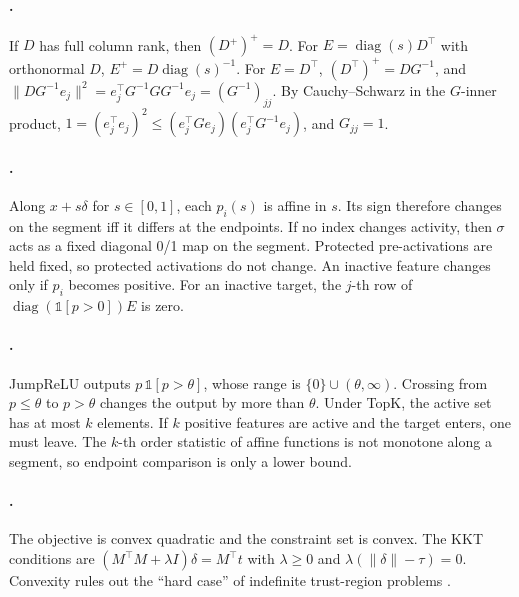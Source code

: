 \documentclass{article}
\theoremstyle{plain}
\theoremstyle{definition}
\theoremstyle{remark}
\begin{document}
\paragraph{.}
If $D$ has full column rank, then $(D^{+})^{+} = D$. For
$E = \operatorname{diag}(s)D^{\top}$ with orthonormal $D$,
$E^{+} = D\operatorname{diag}(s)^{-1}$. For $E = D^{\top}$,
$(D^{\top})^{+} = DG^{-1}$, and
$\|DG^{-1}e_j\|^2 = e_j^{\top}G^{-1}GG^{-1}e_j = (G^{-1})_{jj}$. By Cauchy--Schwarz in the
$G$-inner product, $1 = (e_j^{\top}e_j)^2 \le (e_j^{\top}Ge_j)(e_j^{\top}G^{-1}e_j)$, and
$G_{jj} = 1$.

\paragraph{.}
Along $x + s\delta$ for $s\in[0,1]$, each $p_i(s)$ is affine in $s$. Its sign therefore
changes on the segment iff it differs at the endpoints. If no index changes activity, then
$\sigma$ acts as a fixed diagonal 0/1 map on the segment. Protected pre-activations are held
fixed, so protected activations do not change. An inactive feature changes only if $p_i$
becomes positive. For an inactive target, the $j$-th row of
$\operatorname{diag}(\mathbb{1}[p>0])E$ is zero.

\paragraph{.}
JumpReLU outputs $p\,\mathbb{1}[p>\theta]$, whose range is $\{0\}\cup(\theta,\infty)$.
Crossing from $p\le\theta$ to $p>\theta$ changes the output by more than $\theta$. Under
TopK, the active set has at most $k$ elements. If $k$ positive features are active and the
target enters, one must leave. The $k$-th order statistic of affine functions is not
monotone along a segment, so endpoint comparison is only a lower bound.

\paragraph{.}
The objective is convex quadratic and the constraint set is convex. The KKT conditions are
$(M^{\top}M+\lambda I)\delta = M^{\top}t$ with $\lambda\ge0$ and
$\lambda(\|\delta\|-\tau) = 0$. Convexity rules out the ``hard case'' of indefinite
trust-region problems \citep{more1983computing}.
\end{document}
